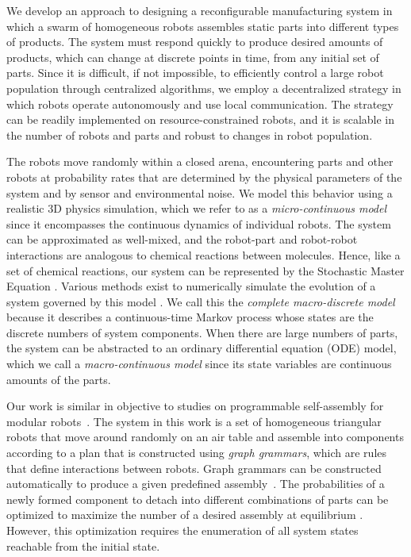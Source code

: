 We develop an approach to designing a reconfigurable manufacturing
system in which a swarm of homogeneous robots assembles static parts
into different types of products.  The system must respond quickly
to produce desired amounts of products, which can change at discrete
points in time, from any initial set of parts.  Since it is
difficult, if not impossible, to efficiently control a large robot
population through centralized algorithms, we employ a decentralized
strategy in which robots operate autonomously and use local
communication. The strategy can be readily implemented on
resource-constrained robots, and it is scalable in the number of
robots and parts and robust to changes in robot population.

The robots move randomly within a closed arena, encountering parts
and other robots at probability rates that are determined by the
physical parameters of the system and by sensor and environmental
noise.  We model this behavior using a realistic 3D physics
simulation, which we refer to as a {\it micro-continuous model}
since it encompasses the continuous dynamics of individual robots.
 The system can be approximated as well-mixed, and the robot-part and
robot-robot interactions are analogous to chemical reactions between
molecules.  Hence, like a set of chemical reactions, our system can
be represented by the Stochastic Master Equation
\cite{ref:Gillespie76}.  Various methods exist to numerically
simulate the evolution of a system governed by this model
\cite{Gillespie:2007p1788,Puchalka:2004p4312}.  We call this the
{\it complete macro-discrete model} because it describes a
continuous-time Markov process whose states are the discrete numbers
of system components.  When there are large numbers of parts, the
system can be abstracted to an ordinary differential equation (ODE)
model, which we call a {\it macro-continuous model} since its state
variables are continuous amounts of the parts.

Our work is similar in objective to studies on programmable
self-assembly for modular robots~\cite{Bishop:2005p2706,
Klavins:2007p2600, McNew:2008p2781, Klavins:2008p3969}.  The system
in this work is a set of homogeneous triangular robots that move
around randomly on an air table and assemble into
 components according to a plan that is constructed using
{\it graph grammars}, which are rules that define interactions
 between robots.  Graph grammars can be constructed
automatically to produce a given predefined
assembly~\cite{Klavins:2008p3969}.  The probabilities of a newly
formed component to detach into different combinations of parts can
be optimized to maximize the number of a desired assembly at
equilibrium \cite{Klavins:2007p2600}.  However, this optimization
requires the enumeration of all system states reachable from the
initial state.

